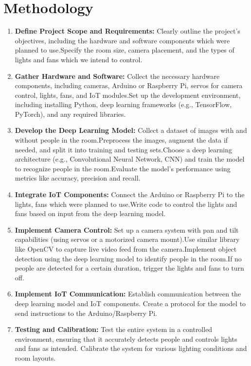 \documentclass[12pt,a4paper]{report}
\begin{document}
\section*{Methodology}
\begin{enumerate}
    \item \textbf{Define Project Scope and Requirements:} Clearly outline the project's objectives, including the hardware and software components which were planned to use.Specify the room size, camera placement, and the types of lights and fans which we intend to control.
    \item \textbf{Gather Hardware and Software:} Collect the necessary hardware components, including cameras, Arduino or Raspberry Pi, servos for camera control, lights, fans, and IoT modules.Set up the development environment, including installing Python, deep learning frameworks (e.g., TensorFlow, PyTorch), and any required libraries.
    \item \textbf{Develop the Deep Learning Model:} Collect a dataset of images with and without people in the room.Preprocess the images, augment the data if needed, and split it into training and testing sets.Choose a deep learning architecture (e.g., Convolutional Neural Network, CNN) and train the model to recognize people in the room.Evaluate the model's performance using metrics like accuracy, precision and recall.
    \item \textbf{Integrate IoT Components:} Connect the Arduino or Raspberry Pi to the lights, fans which were planned to use.Write code to control the lights and fans based on input from the deep learning model.
    \item \textbf{Implement Camera Control:} Set up a camera system with pan and tilt capabilities (using servos or a motorized camera mount).Use similar library like OpenCV to capture live video feed from the camera.Implement object detection using the deep learning model to identify people in the room.If no people are detected for a certain duration, trigger the lights and fans to turn off.
    \item \textbf{Implement IoT Communication:} Establish communication between the deep learning model and IoT components. Create a protocol for the model to send instructions to the Arduino/Raspberry Pi.
    \item \textbf{Testing and Calibration:} Test the entire system in a controlled environment, ensuring that it accurately detects people and controls lights and fans as intended. Calibrate the system for various lighting conditions and room layouts.

\end{enumerate}
\end{document}
